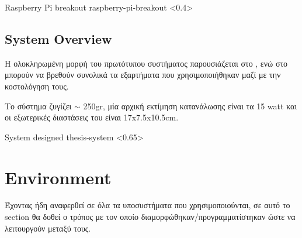 %
{Raspberry Pi breakout}%
{raspberry-pi-breakout}%
<0.4>


\subsection{System Overview}
Η ολοκληρωμένη μορφή του πρωτότυπου συστήματος παρουσιάζεται στο , ενώ στο  μπορούν να βρεθούν συνολικά τα εξαρτήματα που χρησιμοποιήθηκαν μαζί με την κοστολόγηση τους. 

Το σύστημα ζυγίζει $\sim$ 250gr, μία αρχική εκτίμηση κατανάλωσης είναι τα 15 watt και οι εξωτερικές διαστάσεις του είναι 17x7.5x10.5cm.

{System designed}%
{thesis-system}%
<0.65>

\begin{table}[H]
    \caption[]{Bill of Materials}
    \label{tab:thesis-system-bom}
    \centering
  \end{table}


\section{Environment}
Έχοντας ήδη αναφερθεί σε όλα τα υποσυστήματα που χρησιμοποιούνται, σε αυτό το section θα δοθεί ο τρόπος με τον οποίο διαμορφώθηκαν/προγραμματίστηκαν ώστε να λειτουργούν μεταξύ τους.

